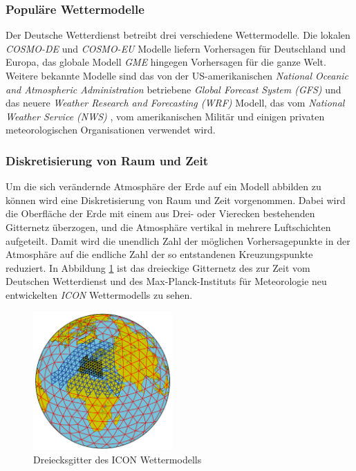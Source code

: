 \subsubsection{Populäre Wettermodelle}

Der Deutsche Wetterdienst betreibt drei verschiedene
Wettermodelle. Die lokalen \textit{COSMO-DE} und \textit{COSMO-EU}
Modelle liefern Vorhersagen für Deutschland und Europa, das globale
Modell \textit{GME} hingegen Vorhersagen für die ganze Welt. Weitere
bekannte Modelle sind das von der US-amerikanischen \textit{National
  Oceanic and Atmospheric Administration} betriebene \textit{Global
  Forecast System (GFS)} 
und das neuere \textit{Weather Research and Forecasting (WRF)}
 Modell, das vom
\textit{National Weather Service (NWS)} , vom amerikanischen Militär und einigen privaten
meteorologischen Organisationen verwendet wird.

\subsubsection{Diskretisierung von Raum und Zeit}

Um die sich verändernde Atmosphäre der Erde auf ein Modell abbilden zu
können wird eine Diskretisierung von Raum und Zeit vorgenommen. Dabei
wird die Oberfläche der Erde mit einem aus Drei- oder Vierecken
bestehenden Gitternetz überzogen, und die Atmosphäre vertikal in
mehrere Luftschichten aufgeteilt. Damit wird die unendlich Zahl der
möglichen Vorhersagepunkte in der Atmosphäre auf die endliche Zahl der
so entstandenen Kreuzungspunkte reduziert. In Abbildung
\ref{gitternetz} ist das dreieckige Gitternetz des zur Zeit vom
Deutschen Wetterdienst und des Max-Planck-Instituts für Meteorologie
neu entwickelten \textit{ICON}  Wettermodells zu sehen.

\begin{figure}[h]
  \begin{center}
    \includegraphics[height=200px]{bilder/gitternetz}
    \caption{Dreiecksgitter des ICON Wettermodells}
    \label{gitternetz}
  \end{center}
\end{figure}

